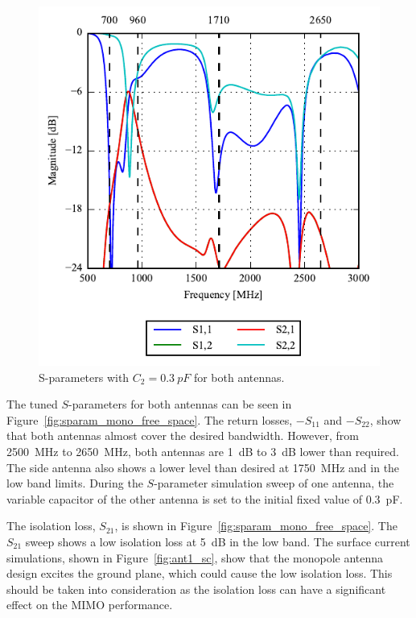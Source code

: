 \begin{figure}[htbp]
    \centering
    \includegraphics{img/tech_sol/monopole/ant1_sparam}
    \caption{S-parameters with $C_2=\SI{0.3}{pF}$ for both antennas.}
    \label{fig:ant1_sparam}
\end{figure}
The tuned $S$-parameters for both antennas can be seen in Figure~\ref{fig:sparam_mono_free_space}. The return losses, $-S_{11}$ and $-S_{22}$, show that both antennas almost cover the desired bandwidth. However, from \SI{2500}{MHz} to \SI{2650}{MHz}, both antennas are \SI{1}{dB} to \SI{3}{dB} lower than required. The side antenna also shows a lower level than desired at \SI{1750}{MHz} and in the low band limits. During the $S$-parameter simulation sweep of one antenna, the variable capacitor of the other antenna is set to the initial fixed value of \SI{0.3}{pF}. 

The isolation loss, $S_{21}$, is shown in Figure~\ref{fig:sparam_mono_free_space}. The $S_{21}$ sweep shows a low isolation loss at \SI{5}{dB} in the low band. The surface current simulations, shown in Figure~\ref{fig:ant1_sc}, show that the monopole antenna design excites the ground plane, which could cause the low isolation loss. This should be taken into consideration as the isolation loss can have a significant effect on the MIMO performance.

